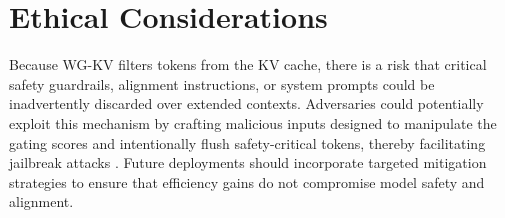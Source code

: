 \section*{Ethical Considerations}

Because WG-KV filters tokens from the KV cache, there is a risk that critical safety guardrails, alignment instructions, or system prompts could be inadvertently discarded over extended contexts. Adversaries could potentially exploit this mechanism by crafting malicious inputs designed to manipulate the gating scores and intentionally flush safety-critical tokens, thereby facilitating jailbreak attacks \cite{attack}. Future deployments should incorporate targeted mitigation strategies to ensure that efficiency gains do not compromise model safety and alignment.